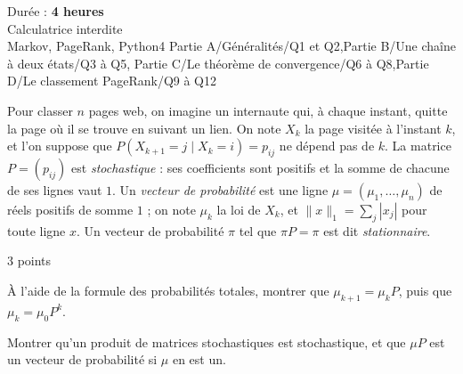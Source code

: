 
  {Durée : \textbf{4 heures}\\Calculatrice interdite\\Markov, PageRank, Python}{4}
  {Partie A/Généralités/Q1 et Q2,Partie B/Une chaîne à deux états/Q3 à Q5,%
   Partie C/Le théorème de convergence/Q6 à Q8,Partie D/Le classement PageRank/Q9 à Q12}
\enParties
{}

Pour classer $n$ pages web, on imagine un internaute qui, à chaque instant,
quitte la page où il se trouve en suivant un lien. On note $X_k$ la page
visitée à l'instant $k$, et l'on suppose que
$P(X_{k+1}=j\mid X_k=i)=p_{ij}$ ne dépend pas de $k$. La matrice
$P=(p_{ij})$ est \emph{stochastique} : ses coefficients sont positifs et la
somme de chacune de ses lignes vaut $1$. Un \emph{vecteur de probabilité}
est une ligne $\mu=(\mu_1,\dots,\mu_n)$ de réels positifs de somme $1$ ; on
note $\mu_k$ la loi de $X_k$, et $\lVert x\rVert_1=\sum_j|x_j|$ pour toute
ligne $x$. Un vecteur de probabilité $\pi$ tel que $\pi P=\pi$ est dit
\emph{stationnaire}.

\begin{exoEval}[Généralités]{3 points}{}
\begin{questions}
  \item À l'aide de la formule des probabilités totales, montrer que
    $\mu_{k+1}=\mu_kP$, puis que $\mu_k=\mu_0P^{k}$.
  \item Montrer qu'un produit de matrices stochastiques est stochastique,
    et que $\mu P$ est un vecteur de probabilité si $\mu$ en est un.
\end{questions}
\end{exoEval}

